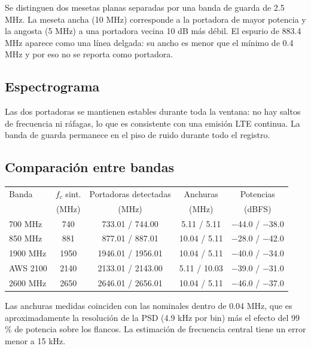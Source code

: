\documentclass[11pt,a4paper]{article}
\begin{document}
Se distinguen dos mesetas planas separadas por una banda de guarda de 2.5 MHz. La meseta
ancha (10 MHz) corresponde a la portadora de mayor potencia y la angosta (5 MHz) a una
portadora vecina 10 dB más débil. El espurio de 883.4 MHz aparece como una línea delgada:
su ancho es menor que el mínimo de 0.4 MHz y por eso no se reporta como portadora.

\subsection{Espectrograma}


Las dos portadoras se mantienen estables durante toda la ventana: no hay saltos de
frecuencia ni ráfagas, lo que es consistente con una emisión LTE continua. La banda de
guarda permanece en el piso de ruido durante todo el registro.

\subsection{Comparación entre bandas}


\begin{tabularx}{\linewidth}{@{}lcccc@{}}
  \toprule
  Banda & $f_c$ sint. & Portadoras detectadas & Anchuras & Potencias \\
        & (MHz) & (MHz) & (MHz) & (dBFS) \\
  \midrule
  700 MHz    & 740  & 733.01 / 744.00 & 5.11 / 5.11 & $-$44.0 / $-$38.0 \\
  850 MHz    & 881  & 877.01 / 887.01 & 10.04 / 5.11 & $-$28.0 / $-$42.0 \\
  1900 MHz   & 1950 & 1946.01 / 1956.01 & 10.04 / 5.11 & $-$40.0 / $-$34.0 \\
  AWS 2100   & 2140 & 2133.01 / 2143.00 & 5.11 / 10.03 & $-$39.0 / $-$31.0 \\
  2600 MHz   & 2650 & 2646.01 / 2656.01 & 10.04 / 5.11 & $-$46.0 / $-$37.0 \\
  \bottomrule
\end{tabularx}

Las anchuras medidas coinciden con las nominales dentro de 0.04 MHz, que es aproximadamente
la resolución de la PSD (4.9 kHz por bin) más el efecto del 99\,\% de potencia sobre los
flancos. La estimación de frecuencia central tiene un error menor a 15 kHz.
\end{document}
